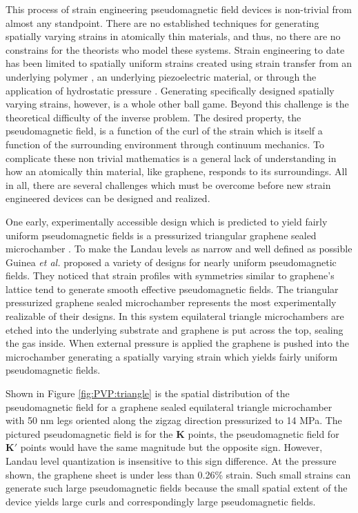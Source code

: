 This process of strain engineering pseudomagnetic field devices is non-trivial from almost any standpoint.
There are no established techniques for generating spatially varying strains in atomically thin materials, and thus, no there are no constrains for the theorists who model these systems.
Strain engineering to date has been limited to spatially uniform strains created using strain transfer from an underlying polymer \cite{Yu2008,Ni2008,Tsoukleri2009,Huang2009,Mohiuddin2009,Frank2010,Yoon2011}, an underlying piezoelectric material, \cite{Ding2010,Jie2013} or through the application of hydrostatic pressure \cite{Proctor2009,Clark2012}.
Generating specifically designed spatially varying strains, however, is a whole other ball game.
Beyond this challenge is the theoretical difficulty of the inverse problem.
The desired property, the pseudomagnetic field, is a function of the curl of the strain which is itself a function of the surrounding environment through continuum mechanics.
To complicate these non trivial mathematics is a general lack of understanding in how an atomically thin material, like graphene, responds to its surroundings.
All in all, there are several challenges which must be overcome before new strain engineered devices can be designed and realized.

One early, experimentally accessible design which is predicted to yield fairly uniform pseudomagnetic fields is a pressurized triangular graphene sealed microchamber \cite{Guinea2009}.
To make the Landau levels as narrow and well defined as possible Guinea \textit{et al.} proposed a variety of designs for nearly uniform pseudomagnetic fields.
They noticed that strain profiles with symmetries similar to graphene's lattice tend to generate smooth effective pseudomagnetic fields.
The triangular pressurized graphene sealed microchamber represents the most experimentally realizable of their designs.
In this system equilateral triangle microchambers are etched into the underlying substrate and graphene is put across the top, sealing the gas inside.
When external pressure is applied the graphene is pushed into the microchamber generating a spatially varying strain which yields fairly uniform pseudomagnetic fields.

Shown in Figure \ref{fig:PVP:triangle} is the spatial distribution of the pseudomagnetic field for a graphene sealed equilateral triangle microchamber with 50 nm legs oriented along the zigzag direction pressurized to 14 MPa.
The pictured pseudomagnetic field is for the $\bm{K}$ points, the pseudomagnetic field for $\bm{K'}$ points would have the same magnitude but the opposite sign.
However, Landau level quantization is insensitive to this sign difference.
At the pressure shown, the graphene sheet is under less than 0.26\% strain.
Such small strains can generate such large pseudomagnetic fields because the small spatial extent of the device yields large curls and correspondingly large pseudomagnetic fields.

